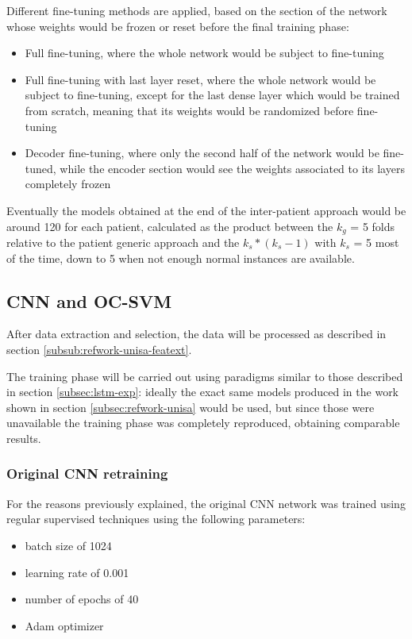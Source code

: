 Different fine-tuning methods are applied, based on the section of the network whose weights would be frozen or reset before the final training phase:

\begin{itemize}
    \item Full fine-tuning, where the whole network would be subject to fine-tuning
    \item Full fine-tuning with last layer reset, where the whole network would be subject to fine-tuning, except for the last dense layer which would be trained from scratch, meaning that its weights would be randomized before fine-tuning
    \item Decoder fine-tuning, where only the second half of the network would be fine-tuned, while the encoder section would see the weights associated to its layers completely frozen
\end{itemize}

Eventually the models obtained at the end of the inter-patient approach would be around 120 for each patient, calculated as the product between the $k_g$ = 5 folds relative to the patient generic approach and the $k_s* (k_s-1)$ with $k_s$ = 5 most of the time, down to 5 when not enough normal instances are available. 

\subsection{CNN and OC-SVM}
After data extraction and selection, the data will be processed as described in section \ref{subsub:refwork-unisa-featext}.

The training phase will be carried out using paradigms similar to those described in section \ref{subsec:lstm-exp}:
ideally the exact same models produced in the work shown in section \ref{subsec:refwork-unisa} would be used, but since those were unavailable the training phase was completely reproduced, obtaining comparable results.

\subsubsection{Original CNN retraining} \label{subsub:original-cnn-retraining}
For the reasons previously explained, the original \gls{CNN} network was trained using regular supervised techniques using the following parameters:

\begin{itemize}
    \item batch size of 1024
    \item learning rate of 0.001
    \item number of epochs of 40
    \item Adam optimizer 
\end{itemize}

